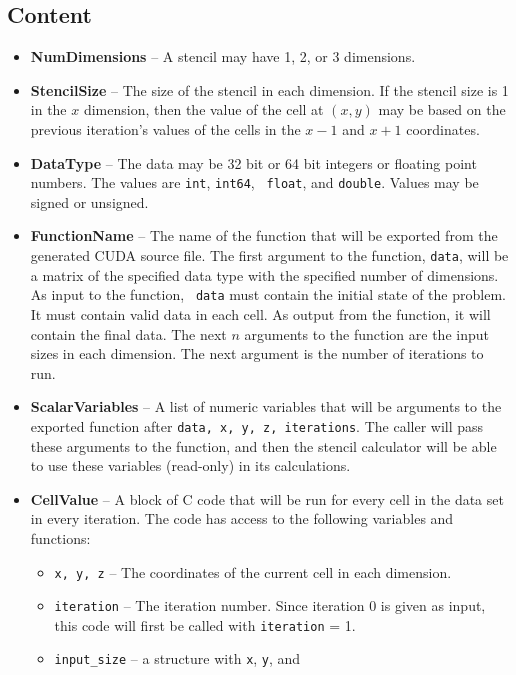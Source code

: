 \documentclass{styles/sig-alternate}
\begin{document}
\subsection{Content}

\begin{itemize}
\item {\bf NumDimensions} -- A stencil may have 1, 2, or 3 dimensions.
\item {\bf StencilSize} -- The size of the stencil in each dimension.
  If the stencil size is 1 in the $x$ dimension, then the value of the
  cell at $(x, y)$ may be based on the previous iteration's values of
  the cells in the $x-1$ and $x+1$ coordinates.
\item {\bf DataType} -- The data may be 32 bit or 64 bit integers or
  floating point numbers.  The values are {\tt int}, {\tt int64}, {\tt
    float}, and {\tt double}.  Values may be signed or unsigned.
\item {\bf FunctionName} -- The name of the function that will be exported
  from the generated CUDA source file.  The first argument to the function,
  {\tt data}, will be a matrix of the specified data type with the
  specified number of dimensions.  As input to the function, {\tt
    data} must contain the initial state of the problem.  It must
  contain valid data in each cell.  As
  output from the function, it will contain the final data.  The next
  $n$ arguments to the function are the input sizes in each dimension.
  The next argument is the number of iterations to run.
\item {\bf ScalarVariables} -- A list of numeric variables that will
  be arguments to the exported function after {\tt data, x, y, z,
    iterations}.  The caller will pass these arguments to the
  function, and then the stencil calculator will be able to use these
  variables (read-only) in its calculations.
\item {\bf CellValue} -- A block of C code that will be run for every
  cell in the data set in every iteration.  The code has access to the
  following variables and functions:
\begin{itemize}
\item {\tt x, y, z} -- The coordinates of the current cell in each
  dimension.
\item {\tt iteration} -- The iteration number.  Since iteration 0 is
  given as input, this code will first be called with {\tt iteration}
  = 1.
\item {\tt input\_size} -- a structure with {\tt x}, {\tt y}, and {\tt
}
\end{itemize}
\end{itemize}
\end{document}

